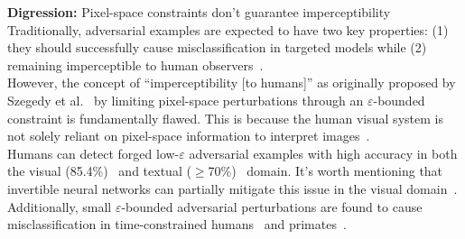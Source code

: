 \documentclass[a4paper, oneside]{discothesis}
\begin{document}
\begin{highlightbox}
	\textbf{Digression:} Pixel-space constraints don't guarantee imperceptibility \\

	Traditionally, adversarial examples are expected to have two key properties: (1) they should successfully cause misclassification in targeted models while (2) remaining imperceptible to human observers~\cite{cubuk2017intriguing}. \\

	However, the concept of ``imperceptibility [to humans]'' as originally proposed by Szegedy et al.~\cite{szegedy2013intriguing} by limiting pixel-space perturbations through an $\varepsilon$-bounded constraint is fundamentally flawed. This is because the human visual system is not solely reliant on pixel-space information to interpret images~\cite{mentzer2020high, ning2023hflic}. \\

	Humans can detect forged low-$\varepsilon$ adversarial examples with high accuracy in both the visual (85.4\%)~\cite{veerabadran2023subtle} and textual ($\geq$70\%)~\cite{herel2023preserving} domain. It's worth mentioning that invertible neural networks can partially mitigate this issue in the visual domain~\cite{chen2023imperceptible}. \\
	
	Additionally, small $\varepsilon$-bounded adversarial perturbations are found to cause misclassification in time-constrained humans~\cite{elsayed2018adversarial} and primates~\cite{yuan2020fooling}.
\end{highlightbox}
\end{document}
